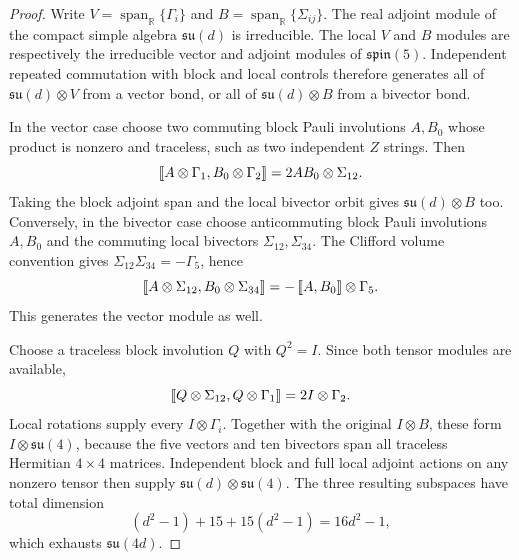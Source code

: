 \begin{proof}
Write $V=\operatorname{span}_{\mathbb R}\{\Gamma_i\}$ and $B=\operatorname{span}_{\mathbb R}\{\Sigma_{ij}\}$.
The real adjoint module of the compact simple algebra $\mathfrak{su}(d)$ is irreducible.
The local $V$ and $B$ modules are respectively the irreducible vector and adjoint modules of $\mathfrak{spin}(5)$.
Independent repeated commutation with block and local controls therefore generates all of $\mathfrak{su}(d)\otimes V$ from a vector bond, or all of $\mathfrak{su}(d)\otimes B$ from a bivector bond.

In the vector case choose two commuting block Pauli involutions $A,B_0$ whose product is nonzero and traceless, such as two independent $Z$ strings.
Then
\begin{equation}
 \left\llbracket A\otimes\Gamma_1,B_0\otimes\Gamma_2\right\rrbracket
 =2AB_0\otimes\Sigma_{12}.
\end{equation}
Taking the block adjoint span and the local bivector orbit gives $\mathfrak{su}(d)\otimes B$ too.
Conversely, in the bivector case choose anticommuting block Pauli involutions $A,B_0$ and the commuting local bivectors $\Sigma_{12},\Sigma_{34}$.
The Clifford volume convention gives $\Sigma_{12}\Sigma_{34}=-\Gamma_5$, hence
\begin{equation}
 \left\llbracket A\otimes\Sigma_{12},B_0\otimes\Sigma_{34}\right\rrbracket
 =-\left\llbracket A,B_0\right\rrbracket\otimes\Gamma_5.
\end{equation}
This generates the vector module as well.

Choose a traceless block involution $Q$ with $Q^2=I$.
Since both tensor modules are available,
\begin{equation}
 \left\llbracket Q\otimes\Sigma_{12},Q\otimes\Gamma_1\right\rrbracket
 =2I\otimes\Gamma_2.
\end{equation}
Local rotations supply every $I\otimes\Gamma_i$.
Together with the original $I\otimes B$, these form $I\otimes\mathfrak{su}(4)$, because the five vectors and ten bivectors span all traceless Hermitian $4\times4$ matrices.
Independent block and full local adjoint actions on any nonzero tensor then supply $\mathfrak{su}(d)\otimes\mathfrak{su}(4)$.
The three resulting subspaces have total dimension
\begin{equation}
 (d^2-1)+15+15(d^2-1)=16d^2-1,
\end{equation}
which exhausts $\mathfrak{su}(4d)$.
\end{proof}

